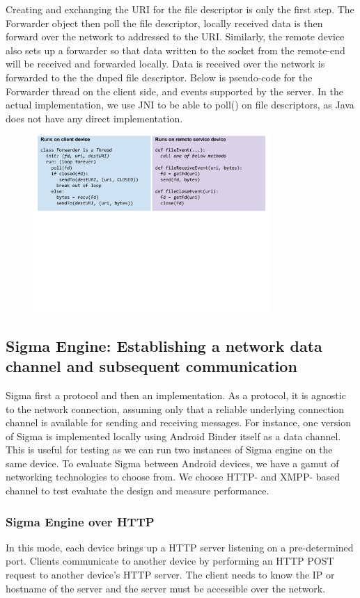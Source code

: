 \documentclass[prodmode]{acmlarge}
\begin{document}
Creating and exchanging the URI for the file descriptor is only the first step. The Forwarder object then poll the file descriptor, locally received data is then forward over the network to addressed to the URI. Similarly, the remote device also sets up a forwarder so that data written to the socket from the remote-end will be received and forwarded locally. Data is received over the network is forwarded to the the duped file descriptor. Below is pseudo-code for the Forwarder thread on the client side, and events supported by the server. In the actual implementation, we use JNI to be able to poll() on file descriptors, as Java does not have any direct implementation.
\begin{figure}[h]
\centering
\includegraphics[width=0.8\textwidth]{drawings/forwardFds.pdf}
\end{figure}

\subsection{Sigma Engine: Establishing a network data channel and subsequent communication}
Sigma first a protocol and then an implementation. As a protocol, it is agnostic to the network connection, assuming only that a reliable underlying connection channel is available for sending and receiving messages. For instance, one version of Sigma is implemented locally using Android Binder itself as a data channel. This is useful for testing as we can run two instances of Sigma engine on the same device. To evaluate Sigma between Android devices, we have a gamut of networking technologies to choose from. We choose HTTP- and XMPP- based channel to test evaluate the design and measure performance.

\subsubsection{Sigma Engine over HTTP}
In this mode, each device brings up a HTTP server listening on a pre-determined port. Clients communicate to another device by performing an HTTP POST request to another device's HTTP server. The client needs to know the IP or hostname of the server and the server must be accessible over the network.
\end{document}
